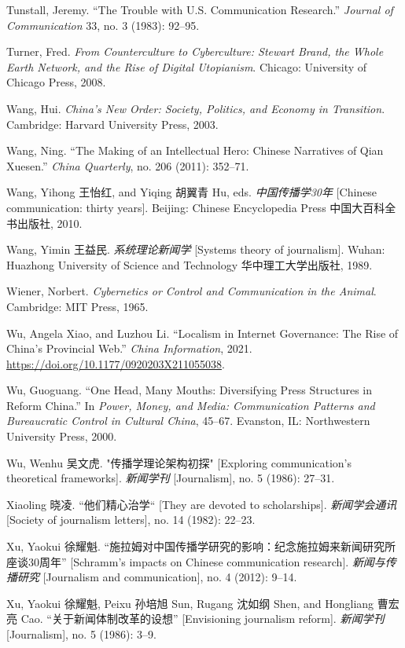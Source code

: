 \documentclass{tufte-handout}
\begin{document}
\begin{CJK*}{UTF8}{gbsn}
\begin{hangparas}{.25in}{1}
\begin{CJK*}{UTF8}{gbsn}
Tunstall, Jeremy. ``The Trouble with U.S. Communication Research.''
\emph{Journal of Communication} 33, no. 3 (1983): 92--95.

Turner, Fred. \emph{From Counterculture to Cyberculture: Stewart Brand,
the Whole Earth Network, and the Rise of Digital Utopianism}. Chicago:
University of Chicago Press, 2008.

Wang, Hui. \emph{China's New Order: Society, Politics, and Economy in
Transition}. Cambridge: Harvard University Press, 2003.

Wang, Ning. ``The Making of an Intellectual Hero: Chinese Narratives of
Qian Xuesen.'' \emph{China Quarterly}, no. 206 (2011): 352--71.

Wang, Yihong 王怡红, and Yiqing 胡翼青 Hu, eds. \emph{中国传播学30年}
{[}Chinese communication: thirty years{]}. Beijing: Chinese Encyclopedia
Press 中国大百科全书出版社, 2010.

Wang, Yimin 王益民. \emph{系统理论新闻学} {[}Systems theory of
journalism{]}. Wuhan: Huazhong University of Science and Technology
华中理工大学出版社, 1989.

Wiener, Norbert. \emph{Cybernetics or Control and Communication in the
Animal}. Cambridge: MIT Press, 1965.

Wu, Angela Xiao, and Luzhou Li. ``Localism in Internet Governance: The
Rise of China's Provincial Web.'' \emph{China Information}, 2021.
\url{https://doi.org/10.1177/0920203X211055038}.

Wu, Guoguang. ``One Head, Many Mouths: Diversifying Press Structures in
Reform China.'' In \emph{Power, Money, and Media: Communication Patterns
and Bureaucratic Control in Cultural China}, 45­--67. Evanston, IL:
Northwestern University Press, 2000.

Wu, Wenhu 吴文虎. "传播学理论架构初探" {[}Exploring communication's
theoretical frameworks{]}. \emph{新闻学刊} {[}Journalism{]}, no. 5
(1986): 27--31.

Xiaoling 晓凌. ``他们精心治学`` {[}They are devoted to scholarships{]}.
\emph{新闻学会通讯} {[}Society of journalism letters{]}, no. 14 (1982):
22--23.

Xu, Yaokui 徐耀魁.
``施拉姆对中国传播学研究的影响：纪念施拉姆来新闻研究所座谈30周年''
{[}Schramm's impacts on Chinese communication research{]}.
\emph{新闻与传播研究} {[}Journalism and communication{]}, no. 4 (2012):
9--14.

Xu, Yaokui 徐耀魁, Peixu 孙培旭 Sun, Rugang 沈如纲 Shen, and Hongliang
曹宏亮 Cao. ``关于新闻体制改革的设想'' {[}Envisioning journalism
reform{]}. \emph{新闻学刊} {[}Journalism{]}, no. 5 (1986): 3--9.


\end{CJK*}
\end{hangparas}
\end{CJK*}
\end{document}
